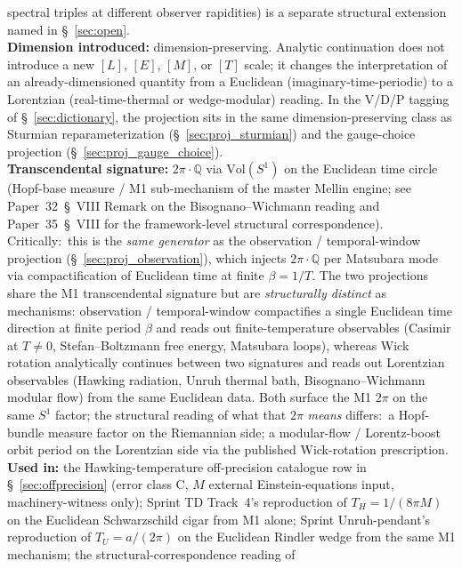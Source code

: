 \documentclass[11pt]{article}
\begin{document}
spectral triples at different observer rapidities) is a separate
structural extension named in \S~\ref{sec:open}.\\
\textbf{Dimension introduced:} dimension-preserving.  Analytic
continuation does not introduce a new $[L]$, $[E]$, $[M]$, or $[T]$
scale; it changes the interpretation of an already-dimensioned
quantity from a Euclidean (imaginary-time-periodic) to a Lorentzian
(real-time-thermal or wedge-modular) reading.  In the V/D/P tagging
of \S~\ref{sec:dictionary}, the projection sits in the same
dimension-preserving class as Sturmian reparameterization
(\S~\ref{sec:proj_sturmian}) and the gauge-choice projection
(\S~\ref{sec:proj_gauge_choice}).\\
\textbf{Transcendental signature:} $2\pi \cdot \mathbb{Q}$ via
$\mathrm{Vol}(S^1)$ on the Euclidean time circle (Hopf-base measure /
M1 sub-mechanism of the master Mellin engine; see Paper~32~\S~VIII
Remark on the Bisognano--Wichmann reading and Paper~35~\S~VIII for
the framework-level structural correspondence).  Critically:\ this
is the \emph{same generator} as the observation / temporal-window
projection (\S~\ref{sec:proj_observation}), which injects
$2\pi \cdot \mathbb{Q}$ per Matsubara mode via compactification of
Euclidean time at finite $\beta = 1/T$.  The two projections share
the M1 transcendental signature but are \emph{structurally distinct}
as mechanisms: observation / temporal-window compactifies a single
Euclidean time direction at finite period $\beta$ and reads out
finite-temperature observables (Casimir at $T \neq 0$,
Stefan--Boltzmann free energy, Matsubara loops), whereas Wick
rotation analytically continues between two signatures and reads out
Lorentzian observables (Hawking radiation, Unruh thermal bath,
Bisognano--Wichmann modular flow) from the same Euclidean data.
Both surface the M1 $2\pi$ on the same $S^1$ factor;
the structural reading of what that $2\pi$ \emph{means} differs:\
a Hopf-bundle measure factor on the Riemannian side; a
modular-flow / Lorentz-boost orbit period on the Lorentzian side
via the published Wick-rotation prescription.\\
\textbf{Used in:} the Hawking-temperature off-precision catalogue
row in \S~\ref{sec:offprecision} (error class C, $M$ external
Einstein-equations input, machinery-witness only); Sprint TD Track~4's
reproduction of $T_H = 1/(8\pi M)$ on the Euclidean Schwarzschild
cigar from M1 alone; Sprint Unruh-pendant's reproduction of
$T_U = a/(2\pi)$ on the Euclidean Rindler wedge from the same M1
mechanism; the structural-correspondence reading of
\end{document}
